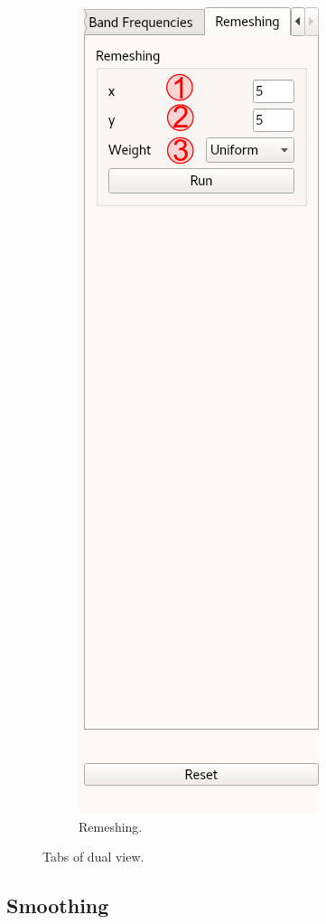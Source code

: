 \documentclass[12pt]{article}
\begin{document}
\begin{figure}[H]
\begin{subfigure}{0.32\textwidth}
		\includegraphics[scale=0.24]{DV-remeshing}
		\caption{Remeshing.}
		\label{fig:DV:remeshing}
	\end{subfigure}
	\caption{Tabs of dual view.}
\end{figure}

\subsection{Smoothing}
\label{sec:dual-view:smoothing}
\end{document}
